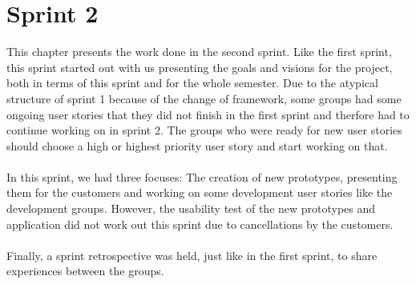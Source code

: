 \chapter{Sprint 2}
This chapter presents the work done in the second sprint.
Like the first sprint, this sprint started out with us presenting the goals and visions for the project, both in terms of this sprint and for the whole semester.
Due to the atypical structure of sprint 1 because of the change of framework, some groups had some ongoing user stories that they did not finish in the first sprint and therfore had to continue working on in sprint 2.
The groups who were ready for new user stories should choose a high or highest priority user story and start working on that.
\\\\
In this sprint, we had three focuses: The creation of new prototypes, presenting them for the customers and working on some development user stories like the development groups.
However, the usability test of the new prototypes and application did not work out this sprint due to cancellations by the customers. 
\\\\
Finally, a sprint retrospective was held, just like in the first sprint, to share experiences between the groups.
